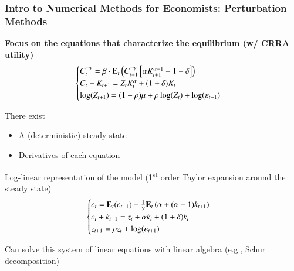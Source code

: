 \documentclass[10pt, aspectratio=1610, handout]{beamer}
\begin{document}
  \begin{frame}
    \frametitle{Intro to Numerical Methods for Economists: Perturbation Methods}

    \textbf{Focus on the equations that characterize the equilibrium (w/ CRRA utility)}
    \begin{equation*}
      \begin{cases}
        C_t^{-\gamma} = \beta \cdot \mathbf{E}_t \left( C_{t+1}^{-\gamma} \left[ \alpha K_{t+1}^{\alpha-1} + 1 - \delta \right] \right) \\
        C_t + K_{t+1} = Z_t K_t^\alpha + (1 + \delta) K_t  \\
        \log(Z_{t+1}) = (1-\rho) \mu + \rho \log(Z_t) + \log(\varepsilon_{t+1})
      \end{cases}
    \end{equation*}

    \vfill\pause

    There exist
    \begin{itemize}
      \item A (deterministic) steady state
      \item Derivatives of each equation
    \end{itemize}

    \vfill\pause

    Log-linear representation of the model (1\textsuperscript{st} order Taylor expansion around the steady state)
    \begin{equation*}
      \begin{cases}
        c_t = \mathbf{E}_t ( c_{t+1} ) - \frac{1}{\gamma} \mathbf{E}_t \left( \alpha + (\alpha-1) k_{t+1} \right) \\
        c_t + k_{t+1} = z_t + \alpha k_t + (1+\delta) k_t \\
        z_{t+1} = \rho z_t + \log(\varepsilon_{t+1})
      \end{cases}
    \end{equation*}

    \vfill\pause

    Can solve this system of linear equations with linear algebra (e.g., Schur decomposition)

  \end{frame}
\end{document}
